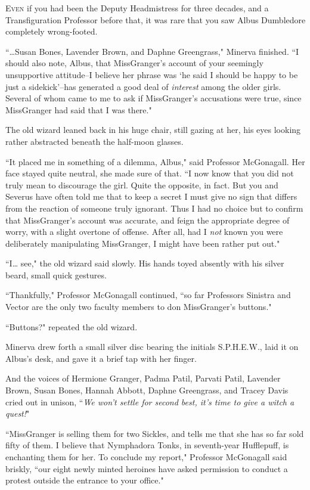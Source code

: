 
\lettrine{E}{ven} if you had been the Deputy Headmistress for three decades, and a Transfiguration Professor before that, it was rare that you saw Albus Dumbledore completely wrong-footed.

``{\ldots}Susan Bones, Lavender Brown, and Daphne Greengrass," Minerva finished. ``I should also note, Albus, that Miss\?Granger's account of your seemingly unsupportive attitude\---I believe her phrase was `he said I should be happy to be just a sidekick'\---has generated a good deal of \emph{interest} among the older girls. Several of whom came to me to ask if Miss\?Granger's accusations were true, since Miss\?Granger had said that I was there."

The old wizard leaned back in his huge chair, still gazing at her, his eyes looking rather abstracted beneath the half-moon glasses.

``It placed me in something of a dilemma, Albus," said Professor McGonagall. Her face stayed quite neutral, she made sure of that. ``I now know that you did not truly mean to discourage the girl. Quite the opposite, in fact. But you and Severus have often told me that to keep a secret I must give no sign that differs from the reaction of someone truly ignorant. Thus I had no choice but to confirm that Miss\?Granger's account was accurate, and feign the appropriate degree of worry, with a slight overtone of offense. After all, had I \emph{not} known you were deliberately manipulating Miss\?Granger, I might have been rather put out."

``I{\ldots} see," the old wizard said slowly. His hands toyed absently with his silver beard, small quick gestures.

``Thankfully," Professor McGonagall continued, ``so far Professors Sinistra and Vector are the only two faculty members to don Miss\?Granger's buttons."

``Buttons?" repeated the old wizard.

Minerva drew forth a small silver disc bearing the initials S.P.H.E.W., laid it on Albus's desk, and gave it a brief tap with her finger.

And the voices of Hermione Granger, Padma Patil, Parvati Patil, Lavender Brown, Susan Bones, Hannah Abbott, Daphne Greengrass, and Tracey Davis cried out in unison, ``\emph{We won't settle for second best, it's time to give a witch a quest!}"

``Miss\?Granger is selling them for two Sickles, and tells me that she has so far sold fifty of them. I believe that Nymphadora Tonks, in seventh-year Hufflepuff, is enchanting them for her. To conclude my report," Professor McGonagall said briskly, ``our eight newly minted heroines have asked permission to conduct a protest outside the entrance to your office."

